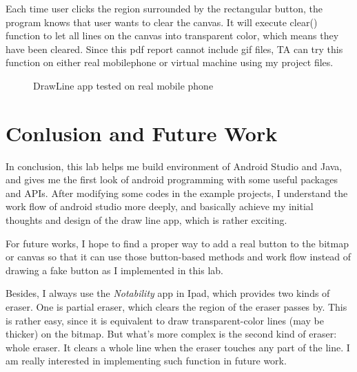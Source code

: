 \documentclass{article}
\begin{document}
Each time user clicks the region surrounded by the rectangular button, the program knows that user wants to clear the canvas. It will execute clear() function to let all lines on the canvas into transparent color, which means they have been cleared. Since this pdf report cannot include gif files, TA can try this function on either real mobilephone or virtual machine using my project files.

\begin{figure}
    \centering
    \caption{DrawLine app tested on real mobile phone}
\end{figure}

\section{Conlusion and Future Work}
In conclusion, this lab helps me build environment of Android Studio and Java, and gives me the first look of android programming with some useful packages and APIs. After modifying some codes in the example projects, I understand the work flow of android studio more deeply, and basically achieve my initial thoughts and design of the draw line app, which is rather exciting.

For future works, I hope to find a proper way to add a real button to the bitmap or canvas so that it can use those button-based methods and work flow instead of drawing a fake button as I implemented in this lab.

Besides, I always use the \emph{Notability} app in Ipad, which provides two kinds of eraser. One is partial eraser, which clears the region of the eraser passes by. This is rather easy, since it is equivalent to draw transparent-color lines (may be thicker) on the bitmap. But what's more complex is the second kind of eraser: whole eraser. It clears a whole line when the eraser touches any part of the line. I am really interested in implementing such function in future work.
\end{document}
